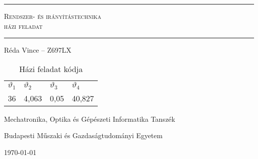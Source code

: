 \begin{titlepage}
\begin{center}

\vspace*{1cm}

{\hrule height 1pt}
\vspace{3mm}
\Huge
\textsc{Rendszer- és irányítástechnika}\\
\Large
\textsc{házi feladat}
\vspace{6mm}
{\hrule height 1pt}
\vspace{14mm}

\Large
Réda Vince -- Z697LX
\normalsize
\vspace{2cm}

\vfill
\begin{table}[H]
\begin{tabular}{llll}
\toprule
$\vartheta_1$& $\vartheta_2$& $\vartheta_3$& $\vartheta_4$\\
36& 4,063& 0,05& 40,827\\
\bottomrule
\end{tabular}
\caption{Házi feladat kódja}
\end{table}
\vspace{1cm}

\large
Mechatronika, Optika és Gépészeti Informatika Tanszék

Budapesti Műszaki és Gazdaságtudományi Egyetem

\vspace{5mm}
\today

\end{center}
\end{titlepage}

